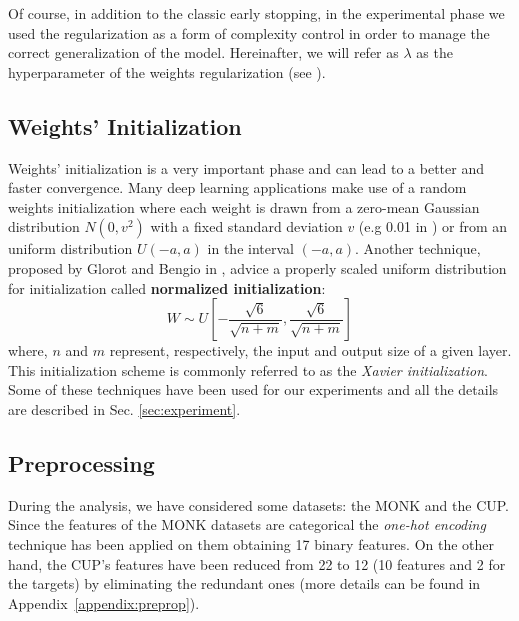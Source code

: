 \documentclass[11pt]{article}
\begin{document}
Of course, in addition to the classic early stopping, in the experimental phase we used the regularization as a form of complexity control in order to manage the correct generalization of the model. Hereinafter, we will refer as $\lambda$ as the hyperparameter of the weights regularization (see \cite{haykin2009neural}).

\subsection{Weights' Initialization}
\label{sec:w_init}
Weights' initialization is a very important phase and can lead to a better and faster convergence. Many deep learning applications make use of a random weights initialization where each weight is drawn from a zero-mean Gaussian distribution $N(0,v^2)$ with a fixed standard deviation $v$ (e.g 0.01 in \cite{Krizhevsky_imagenetclassification}) or from an uniform distribution $U(-a,a)$ in the interval $(-a, a)$. Another technique, proposed by Glorot and Bengio in \cite{Glorot10understandingthe}, advice a properly scaled uniform distribution for initialization called \textbf{normalized initialization}:
$$ W \sim U\left[-\frac{\sqrt{6}}{\sqrt{n + m}}, \frac{\sqrt{6}}{\sqrt{n + m}}\right]$$ 
where, $n$ and $m$ represent, respectively, the input and output size of a given layer. This initialization scheme is commonly referred to as the \textit{Xavier initialization}. Some of these techniques have been used for our experiments and all the details 
are described in Sec. \ref{sec:experiment}.

\subsection{Preprocessing}
\label{sec:preprop}
During the analysis, we have considered some datasets: the MONK and the CUP. Since the features of the MONK datasets are categorical the \emph{one-hot encoding} technique has been applied on them obtaining 17 binary features. On the other hand, the CUP's features have been reduced from 22 to 12 (10 features and 2 for the targets) by eliminating the redundant ones (more details can be found in Appendix~\ref{appendix:preprop}).
\end{document}
